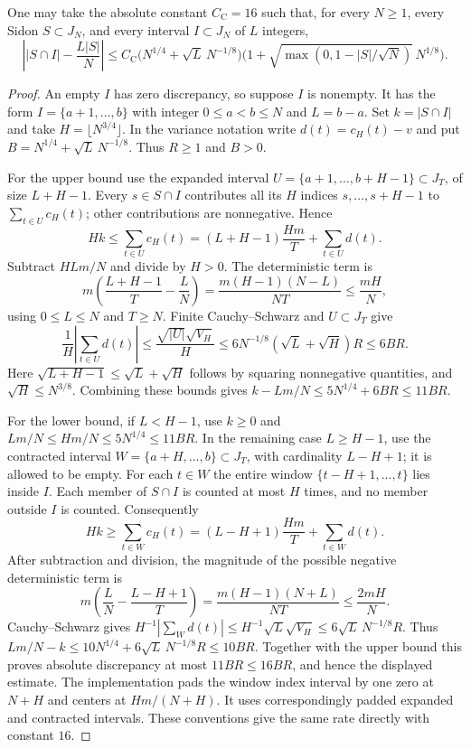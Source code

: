 \begin{theorem}
\leanok
\label{core:cilleruelo-input}
One may take the absolute constant $C_{\mathrm C}=16$ such that,
for every $N\geq1$, every Sidon $S\subset J_N$, and every interval
$I\subset J_N$ of $L$ integers,
\[
 \left||S\cap I|-\frac{L|S|}{N}\right|
 \leq C_{\mathrm C}
       \bigl(N^{1/4}+\sqrt L\,N^{-1/8}\bigr)
       \bigl(1+\sqrt{\max(0,1-|S|/\sqrt N)}\,N^{1/8}\bigr).
\]
\end{theorem}
\begin{proof}
An empty $I$ has zero discrepancy, so suppose $I$ is nonempty.
It has the form $I=\{a+1,\ldots,b\}$ with integer
$0\leq a<b\leq N$ and $L=b-a$.  Set $k=|S\cap I|$ and take
$H=\lfloor N^{3/4}\rfloor$.  In the variance notation write
$d(t)=c_H(t)-v$ and put
$B=N^{1/4}+\sqrt L\,N^{-1/8}$.  Thus $R\geq1$ and $B>0$.

For the upper bound use the expanded interval
$U=\{a+1,\ldots,b+H-1\}\subset J_T$, of size $L+H-1$.
Every $s\in S\cap I$ contributes all its $H$ indices
$s,\ldots,s+H-1$ to $\sum_{t\in U}c_H(t)$; other contributions
are nonnegative.  Hence
\[
 Hk\leq\sum_{t\in U}c_H(t)=(L+H-1)\frac{Hm}{T}
                                      +\sum_{t\in U}d(t).
\]
Subtract $HLm/N$ and divide by $H>0$.  The deterministic term
is
\[
 m\left(\frac{L+H-1}{T}-\frac LN\right)
 =\frac{m(H-1)(N-L)}{NT}\leq\frac{mH}{N},
\]
using $0\leq L\leq N$ and $T\geq N$.
Finite Cauchy--Schwarz and $U\subset J_T$ give
\[
 \frac1H\left|\sum_{t\in U}d(t)\right|
 \leq\frac{\sqrt{|U|}\sqrt{V_H}}H
 \leq6N^{-1/8}(\sqrt L+\sqrt H)R\leq6BR.
\]
Here $\sqrt{L+H-1}\leq\sqrt L+\sqrt H$ follows by squaring
nonnegative quantities, and $\sqrt H\leq N^{3/8}$.
Combining these bounds gives
$k-Lm/N\leq5N^{1/4}+6BR\leq11BR$.

For the lower bound, if $L<H-1$, use $k\geq0$ and
$Lm/N\leq Hm/N\leq5N^{1/4}\leq11BR$.
In the remaining case $L\geq H-1$, use the contracted interval
$W=\{a+H,\ldots,b\}\subset J_T$, with cardinality $L-H+1$;
it is allowed to be empty.  For each $t\in W$ the entire
window $\{t-H+1,\ldots,t\}$ lies inside $I$.  Each member of
$S\cap I$ is counted at most $H$ times, and no member outside
$I$ is counted.  Consequently
\[
 Hk\geq\sum_{t\in W}c_H(t)
        =(L-H+1)\frac{Hm}{T}+\sum_{t\in W}d(t).
\]
After subtraction and division, the magnitude of the possible
negative deterministic term is
\[
 m\left(\frac LN-\frac{L-H+1}{T}\right)
   =\frac{m(H-1)(N+L)}{NT}\leq\frac{2mH}{N}.
\]
Cauchy--Schwarz gives
$H^{-1}|\sum_Wd(t)|\leq H^{-1}\sqrt L\sqrt{V_H}
 \leq6\sqrt L\,N^{-1/8}R$.
Thus $Lm/N-k\leq10N^{1/4}+6\sqrt L\,N^{-1/8}R\leq10BR$.
Together with the upper bound this proves absolute discrepancy
at most $11BR\leq16BR$, and hence the displayed estimate.
The implementation pads the window index interval by one zero
at $N+H$ and centers at $Hm/(N+H)$.  It uses correspondingly
padded expanded and contracted intervals.  These conventions
give the same rate directly with constant $16$.
\end{proof}

